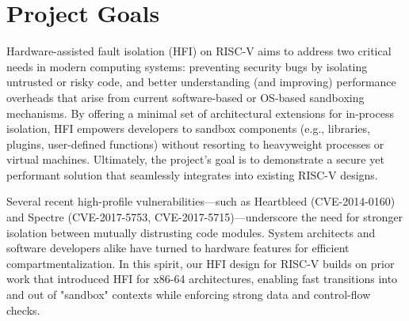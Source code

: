 \documentclass[conference,compsoc]{IEEEtran}
\begin{document}




\maketitle






%
\IEEEpeerreviewmaketitle


\section{Project Goals}
Hardware-assisted fault isolation (HFI) on RISC-V aims to address two critical needs in modern computing systems: preventing security bugs by isolating untrusted or risky code, and better understanding (and improving) performance overheads that arise from current software-based or OS-based sandboxing mechanisms. By offering a minimal set of architectural extensions for in-process isolation, HFI empowers developers to sandbox components (e.g., libraries, plugins, user-defined functions) without resorting to heavyweight processes or virtual machines. Ultimately, the project's goal is to demonstrate a secure yet performant solution that seamlessly integrates into existing RISC-V designs.

Several recent high-profile vulnerabilities—such as Heartbleed (CVE-2014-0160) and Spectre (CVE-2017-5753, CVE-2017-5715)—underscore the need for stronger isolation between mutually distrusting code modules. System architects and software developers alike have turned to hardware features for efficient compartmentalization. In this spirit, our HFI design for RISC-V builds on prior work that introduced HFI for x86-64 architectures, enabling fast transitions into and out of "sandbox" contexts while enforcing strong data and control-flow checks.
\end{document}

